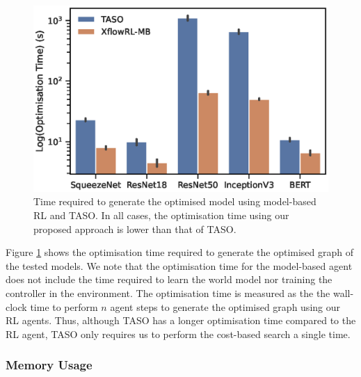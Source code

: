 \begin{figure}[h]
  \centering
  \includegraphics[width=0.75\columnwidth]{sections/5evaluation/images/optimisation_time}
  \caption[Optimisation time for TASO and MB-RL]{Time required to generate the optimised model using model-based RL and TASO. In all cases, the optimisation time using our proposed approach is lower than that of TASO.}
  \label{fig:eval:optimisation-time}
\end{figure}

Figure \ref{fig:eval:optimisation-time} shows the optimisation time required to generate the optimised graph of the tested models. We note that the optimisation time for the model-based agent does not include the time required to learn the world model nor training the controller in the environment. The optimisation time is measured as the the wall-clock time to perform $n$ agent steps to generate the optimised graph using our RL agents. Thus, although TASO has a longer optimisation time compared to the RL agent, TASO only requires us to perform the cost-based search a single time.

\subsubsection{Memory Usage}

